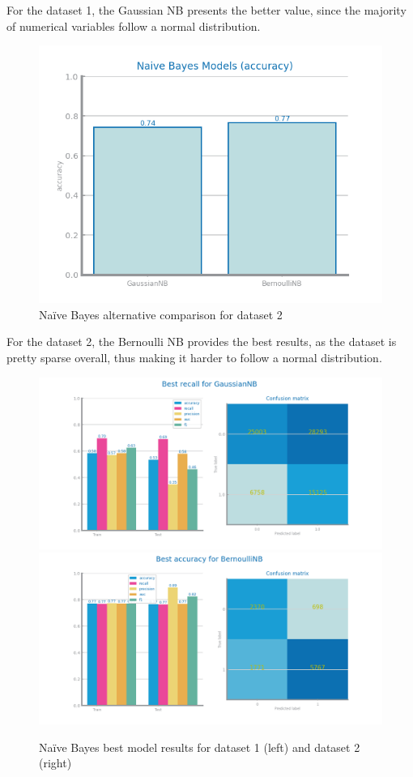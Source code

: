 \documentclass[10pt]{extarticle}
\begin{document}
For the dataset 1, the Gaussian NB presents the better value, since the majority of numerical variables follow a normal distribution.

\begin{figure}[H]
\centering\includegraphics[scale=0.95]{images/dataset2/models_evaluation/Credit_Score_nb_accuracy_study.png}
\caption{Na{\"i}ve Bayes alternative comparison for dataset 2}
\end{figure}

For the dataset 2, the Bernoulli NB provides the best results, as the dataset is pretty sparse overall, thus making it harder to follow a normal distribution.

\begin{figure}[H]
\centering\includegraphics[scale=0.4]{images/dataset1/models_evaluation/CovidPos_GaussianNB_best_recall_eval.png}
\includegraphics[scale=0.4]{images/dataset2/models_evaluation/Credit_Score_nb_BernoulliNB_best_accuracy_eval.png}
\caption{Na{\"i}ve Bayes best model results for dataset 1 (left) and dataset 2 (right)}
\end{figure}
\end{document}
